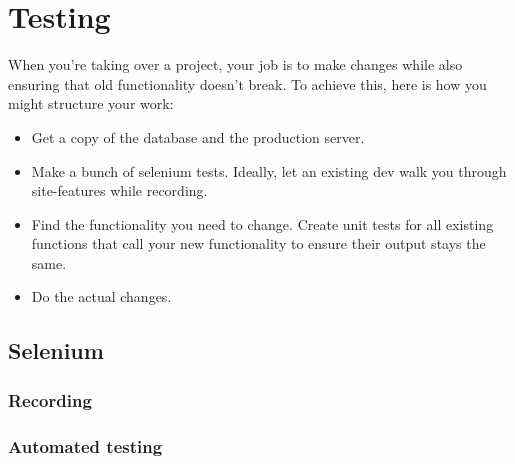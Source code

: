 \section{Testing}

When you're taking over a project, your job is to make changes while also ensuring that old functionality doesn't break. To achieve this, here is how you might structure your work: 

\begin{itemize}
    \item Get a copy of the database and the production server. 
    \item Make a bunch of selenium tests. Ideally, let an existing dev walk you through site-features while recording. 
    \item Find the functionality you need to change. Create unit tests for all existing functions that call your new functionality to ensure their output stays the same.
    \item Do the actual changes. 
\end{itemize}


\subsection{Selenium}
\subsubsection{Recording}
\subsubsection{Automated testing}
